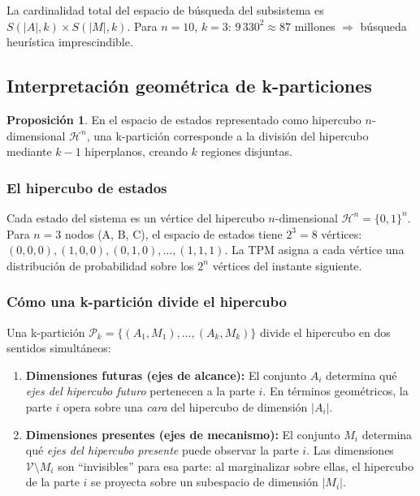\documentclass[12pt,letterpaper]{article}
\theoremstyle{definition}
\newtheorem{proposition}{Proposición}[section]
\theoremstyle{remark}
\newcommand{\V}{\mathcal{V}}
\newcommand{\Part}{\mathcal{P}}
\newcommand{\Stir}[2]{S(#1,#2)}
\begin{document}
La cardinalidad total del espacio de búsqueda del subsistema es
$\Stir{|A|}{k} \times \Stir{|M|}{k}$. Para $n=10$, $k=3$:
$9\,330^2 \approx 87$ millones $\Rightarrow$ búsqueda heurística imprescindible.

\subsection{Interpretación geométrica de k-particiones}

\begin{proposition}
En el espacio de estados representado como hipercubo $n$-dimensional $\mathcal{H}^n$,
una k-partición corresponde a la división del hipercubo mediante $k-1$ hiperplanos,
creando $k$ regiones disjuntas.
\end{proposition}

\subsubsection*{El hipercubo de estados}

Cada estado del sistema es un vértice del hipercubo $n$-dimensional
$\mathcal{H}^n = \{0,1\}^n$. Para $n = 3$ nodos (A, B, C), el espacio de estados
tiene $2^3 = 8$ vértices: $(0,0,0), (1,0,0), (0,1,0), \ldots, (1,1,1)$.
La TPM asigna a cada vértice una distribución de probabilidad sobre los $2^n$ vértices
del instante siguiente.

\subsubsection*{Cómo una k-partición divide el hipercubo}

Una k-partición $\Part_k = \{(A_1,M_1), \ldots, (A_k,M_k)\}$ divide el hipercubo en
dos sentidos simultáneos:

\begin{enumerate}
  \item \textbf{Dimensiones futuras (ejes de alcance):}
    El conjunto $A_i$ determina qué \emph{ejes del hipercubo futuro} pertenecen a la
    parte $i$. En términos geométricos, la parte $i$ opera sobre una \emph{cara} del
    hipercubo de dimensión $|A_i|$.

  \item \textbf{Dimensiones presentes (ejes de mecanismo):}
    El conjunto $M_i$ determina qué \emph{ejes del hipercubo presente} puede observar
    la parte $i$. Las dimensiones $\V \setminus M_i$ son ``invisibles'' para esa parte:
    al marginalizar sobre ellas, el hipercubo de la parte $i$ se proyecta sobre un
    subespacio de dimensión $|M_i|$.
\end{enumerate}
\end{document}
